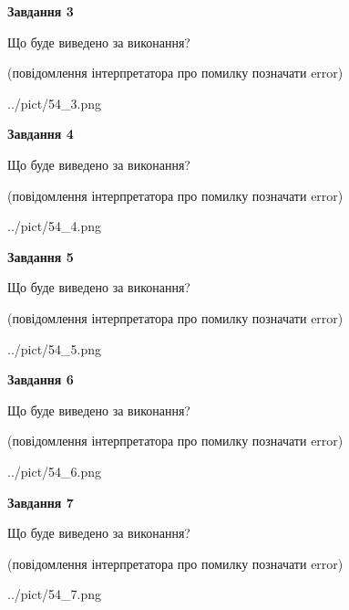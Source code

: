 \documentclass[12pt, ukrainian]{article}
\begin{document}
{\begin {large}
{\begin {center}\textbf{Завдання 3}\end {center}}\par
Що буде виведено за виконання?\par
 (повідомлення інтерпретатора про помилку позначати error)\par
\begin{center}
	{../pict/54_3.png}
\end{center}
\newpage

{\begin {center}\textbf{Завдання 4}\end {center}}\par
Що буде виведено за виконання?\par
 (повідомлення інтерпретатора про помилку позначати error)\par
\begin{center}
	{../pict/54_4.png}
\end{center}
\newpage

{\begin {center}\textbf{Завдання 5}\end {center}}\par
Що буде виведено за виконання?\par
 (повідомлення інтерпретатора про помилку позначати error)\par
\begin{center}
	{../pict/54_5.png}
\end{center}
\newpage

{\begin {center}\textbf{Завдання 6}\end {center}}\par
Що буде виведено за виконання?\par
 (повідомлення інтерпретатора про помилку позначати error)\par
\begin{center}
	{../pict/54_6.png}
\end{center}
\newpage

{\begin {center}\textbf{Завдання 7}\end {center}}\par
Що буде виведено за виконання?\par
 (повідомлення інтерпретатора про помилку позначати error)\par
\begin{center}
	{../pict/54_7.png}
\end{center}
\newpage


\end{large}}
\end{document}
